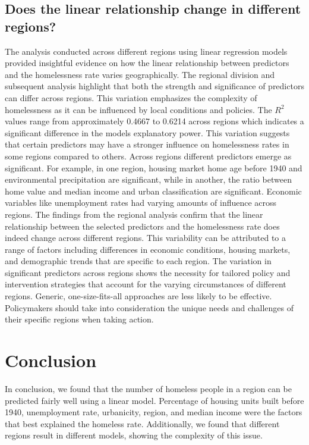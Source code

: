 \documentclass[12pt]{article}
\begin{document}
\subsection{Does the linear relationship change in different regions?}
The analysis conducted across different regions using linear regression models provided insightful evidence on how the linear relationship between predictors and the homelessness rate varies geographically. The regional division and subsequent analysis highlight that both the strength and significance of predictors can differ across regions. This variation emphasizes the complexity of homelessness as it can be influenced by local conditions and policies. The $R^2$ values range from approximately 0.4667 to 0.6214 across regions which indicates a significant difference in the models explanatory power. This variation suggests that certain predictors may have a stronger influence on homelessness rates in some regions compared to others. Across regions different predictors emerge as significant. For example, in one region, housing market home age before 1940 and environmental precipitation are significant, while in another, the ratio between home value and median income and urban classification are significant. Economic variables like unemployment rates had varying amounts of influence across regions. The findings from the regional analysis confirm that the linear relationship between the selected predictors and the homelessness rate does indeed change across different regions. This variability can be attributed to a range of factors including differences in economic conditions, housing markets, and demographic trends that are specific to each region. The variation in significant predictors across regions shows the necessity for tailored policy and intervention strategies that account for the varying circumstances of different regions. Generic, one-size-fits-all approaches are less likely to be effective. Policymakers should take into consideration the unique needs and challenges of their specific regions when taking action.

\section{Conclusion}

In conclusion, we found that the number of homeless people in a region can be predicted fairly well using a linear model. Percentage of housing units built before 1940, unemployment rate, urbanicity, region, and median income were the factors that best explained the homeless rate. Additionally, we found that different regions result in different models, showing the complexity of this issue.
\end{document}
